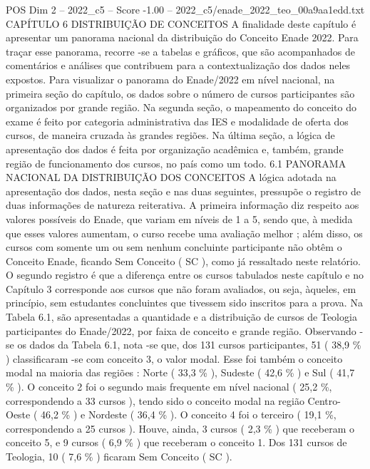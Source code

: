 \begin{textsample}{POS Dim 2 – 2022\_c5 – Score -1.00 – 2022\_c5/enade\_2022\_teo\_00a9aa1edd.txt}  \label{ex:f2_pos_218}
CAPÍTULO 6 DISTRIBUIÇÃO DE CONCEITOS A finalidade deste capítulo é apresentar um panorama nacional da distribuição do Conceito Enade 2022.
Para traçar esse panorama, recorre -se a tabelas e gráficos, que são acompanhados de comentários e análises que contribuem para a contextualização dos dados neles expostos.
Para visualizar o panorama do Enade/2022 em nível nacional, na primeira seção do capítulo, os dados sobre o número de cursos participantes são organizados por grande região.
Na segunda seção, o mapeamento do conceito do exame é feito por categoria administrativa das IES e modalidade de oferta dos cursos, de maneira cruzada às grandes regiões.
Na última seção, a lógica de apresentação dos dados é feita por organização acadêmica e, também, grande região de funcionamento dos cursos, no país como um todo. 6.1 PANORAMA NACIONAL DA DISTRIBUIÇÃO DOS CONCEITOS A lógica adotada na apresentação dos dados, nesta seção e nas duas seguintes, pressupõe o registro de duas informações de natureza reiterativa.
A primeira informação diz respeito aos valores possíveis do Enade, que variam em níveis de 1 a 5, sendo que, à medida que esses valores aumentam, o curso recebe uma avaliação melhor ; além disso, os cursos com somente um ou sem nenhum concluinte participante não obtêm o Conceito Enade, ficando Sem Conceito ( SC ), como já ressaltado neste relatório.
O segundo registro é que a diferença entre os cursos tabulados neste capítulo e no Capítulo 3 corresponde aos cursos que não foram avaliados, ou seja, àqueles, em princípio, sem estudantes concluintes que tivessem sido inscritos para a prova.
Na Tabela 6.1, são apresentadas a quantidade e a distribuição de cursos de Teologia participantes do Enade/2022, por faixa de conceito e grande região.
Observando -se os dados da Tabela 6.1, nota -se que, dos 131 cursos participantes, 51 ( 38,9 \% ) classificaram -se com conceito 3, o valor modal.
Esse foi também o conceito modal na maioria das regiões : Norte ( 33,3 \% ), Sudeste ( 42,6 \% ) e Sul ( 41,7 \% ).
O conceito 2 foi o segundo mais frequente em nível nacional ( 25,2 \%, correspondendo a 33 cursos ), tendo sido o conceito modal na região Centro-Oeste ( 46,2 \% ) e Nordeste ( 36,4 \% ).
O conceito 4 foi o terceiro ( 19,1 \%, correspondendo a 25 cursos ).
Houve, ainda, 3 cursos ( 2,3 \% ) que receberam o conceito 5, e 9 cursos ( 6,9 \% ) que receberam o conceito 1.
Dos 131 cursos de Teologia, 10 ( 7,6 \% ) ficaram Sem Conceito ( SC ).

\end{textsample}
